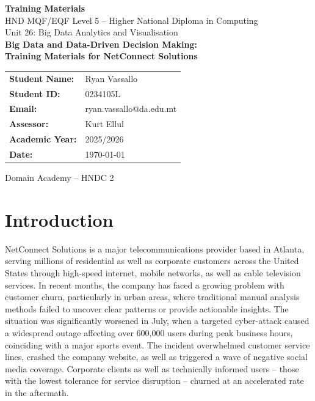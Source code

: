 \documentclass[12pt,a4paper]{article}
\begin{document}
\begin{titlepage}
    \centering
    \vspace*{1cm}

    {\Large \textbf{Training Materials}}\\[0.5cm]
    {\large HND MQF/EQF Level 5 -- Higher National Diploma in Computing}\\[0.3cm]
    {\large Unit 26: Big Data Analytics and Visualisation}\\[2cm]

    {\LARGE \textbf{Big Data and Data-Driven Decision Making:\\[0.4cm]
    Training Materials for NetConnect Solutions}}\\[2cm]

    \begin{tabular}{ll}
        \textbf{Student Name:}   & Ryan Vassallo              \\[0.3cm]
        \textbf{Student ID:}     & 0234105L                   \\[0.3cm]
        \textbf{Email:}          & ryan.vassallo@da.edu.mt    \\[0.3cm]
        \textbf{Assessor:}       & Kurt Ellul                 \\[0.3cm]
        \textbf{Academic Year:}  & 2025/2026                  \\[0.3cm]
        \textbf{Date:}           & \today                     \\
    \end{tabular}

    \vfill
    {\small Domain Academy -- HNDC 2}
\end{titlepage}

\newpage
\tableofcontents

\newpage
\section{Introduction}

NetConnect Solutions is a major telecommunications provider based in Atlanta, serving millions of residential as well as corporate customers across the United States through high-speed internet, mobile networks, as well as cable television services. In recent months, the company has faced a growing problem with customer churn, particularly in urban areas, where traditional manual analysis methods failed to uncover clear patterns or provide actionable insights. The situation was significantly worsened in July, when a targeted cyber-attack caused a widespread outage affecting over 600,000 users during peak business hours, coinciding with a major sports event. The incident overwhelmed customer service lines, crashed the company website, as well as triggered a wave of negative social media coverage. Corporate clients as well as technically informed users -- those with the lowest tolerance for service disruption -- churned at an accelerated rate in the aftermath.
\end{document}
